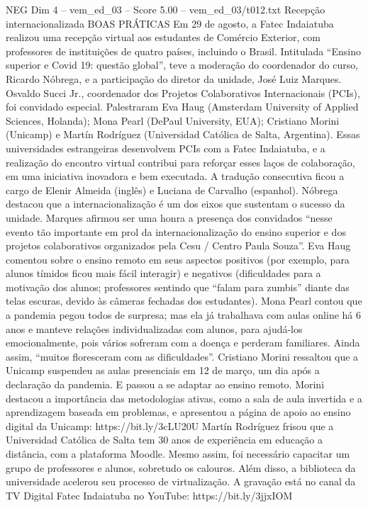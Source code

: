 \begin{textsample}{NEG Dim 4 – vem\_ed\_03 – Score 5.00 – vem\_ed\_03/t012.txt}  \label{ex:f4_neg_115}
Recepção internacionalizada BOAS PRÁTICAS Em 29 de agosto, a Fatec Indaiatuba realizou uma recepção virtual aos estudantes de Comércio Exterior, com professores de instituições de quatro países, incluindo o Brasil.
Intitulada “Ensino superior e Covid 19: questão global”, teve a moderação do coordenador do curso, Ricardo Nóbrega, e a participação do diretor da unidade, José Luiz Marques.
Osvaldo Succi Jr., coordenador dos Projetos Colaborativos Internacionais (PCIs), foi convidado especial.
Palestraram Eva Haug (Amsterdam University of Applied Sciences, Holanda); Mona Pearl (DePaul University, EUA); Cristiano Morini (Unicamp) e Martín Rodríguez (Universidad Católica de Salta, Argentina).
Essas universidades estrangeiras desenvolvem PCIs com a Fatec Indaiatuba, e a realização do encontro virtual contribui para reforçar esses laços de colaboração, em uma iniciativa inovadora e bem executada.
A tradução consecutiva ficou a cargo de Elenir Almeida (inglês) e Luciana de Carvalho (espanhol).
Nóbrega destacou que a internacionalização é um dos eixos que sustentam o sucesso da unidade.
Marques afirmou ser uma honra a presença dos convidados “nesse evento tão importante em prol da internacionalização do ensino superior e dos projetos colaborativos organizados pela Cesu / Centro Paula Souza”.
Eva Haug comentou sobre o ensino remoto em seus aspectos positivos (por exemplo, para alunos tímidos ficou mais fácil interagir) e negativos (dificuldades para a motivação dos alunos; professores sentindo que “falam para zumbis” diante das telas escuras, devido às câmeras fechadas dos estudantes).
Mona Pearl contou que a pandemia pegou todos de surpresa; mas ela já trabalhava com aulas online há 6 anos e manteve relações individualizadas com alunos, para ajudá-los emocionalmente, pois vários sofreram com a doença e perderam familiares.
Ainda assim, “muitos floresceram com as dificuldades”.
Cristiano Morini ressaltou que a Unicamp suspendeu as aulas presenciais em 12 de março, um dia após a declaração da pandemia.
E passou a se adaptar ao ensino remoto.
Morini destacou a importância das metodologias ativas, como a sala de aula invertida e a aprendizagem baseada em problemas, e apresentou a página de apoio ao ensino digital da Unicamp: https://bit.ly/3cLU20U Martín Rodríguez frisou que a Universidad Católica de Salta tem 30 anos de experiência em educação a distância, com a plataforma Moodle.
Mesmo assim, foi necessário capacitar um grupo de professores e alunos, sobretudo os calouros.
Além disso, a biblioteca da universidade acelerou seu processo de virtualização.
A gravação está no canal da TV Digital Fatec Indaiatuba no YouTube: https://bit.ly/3jjxIOM

\end{textsample}
